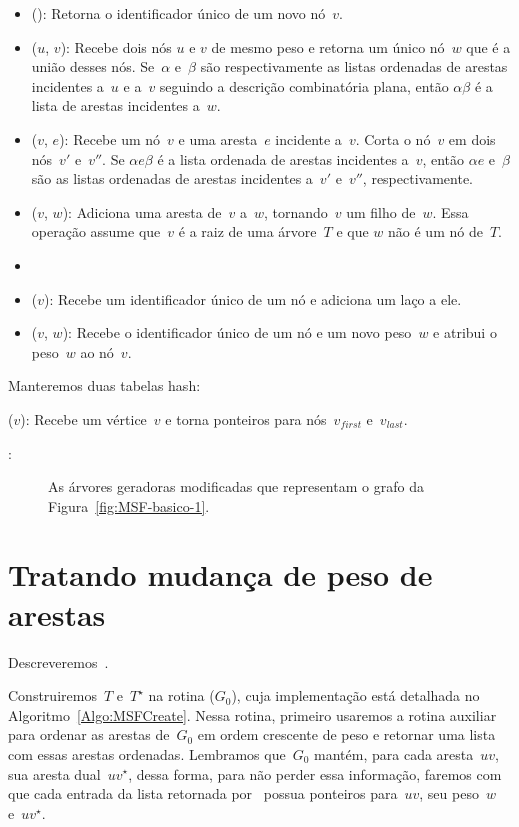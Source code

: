 \begin{itemize}
\item \LCOMakeNode(): Retorna o identificador único de um novo nó~$v$.
\item \LCOMerge($u$, $v$): Recebe dois nós $u$ e $v$ de mesmo peso e retorna um único nó~$w$ que é a união desses nós.
Se~$\alpha$ e~$\beta$ são respectivamente as listas ordenadas de arestas incidentes a~$u$ e a~$v$ seguindo a descrição combinatória plana, então $\alpha\beta$ é a lista de arestas incidentes a~$w$.
\item \LCOSplit($v$, $e$): Recebe um nó~$v$ e uma aresta~$e$ incidente a~$v$.
Corta o nó~$v$ em dois nós~$v'$ e~$v''$. Se $\alpha e\beta$ é a lista ordenada de arestas incidentes a~$v$, então $\alpha e$ e~$\beta$ são as listas ordenadas de arestas incidentes a~$v'$ e~$v''$, respectivamente.
\item \LCOLink($v$, $w$): Adiciona uma aresta de~$v$ a~$w$, tornando~$v$ um filho de~$w$. Essa operação assume que~$v$ é a raiz de uma árvore~$T$ e que $w$ não é um nó de~$T$.
\item \LCOCycle
\item \LCOLoop($v$): Recebe um identificador único de um nó e adiciona um laço a ele.
\item \LCOAddCost($v$, $w$): Recebe o identificador único de um nó e um novo peso~$w$ e atribui o peso~$w$ ao nó~$v$.
\end{itemize}

Manteremos duas tabelas hash:

\hashNP($v$): Recebe um vértice~$v$ e torna ponteiros para nós~$v_{first}$ e~$v_{last}$.

\hashEdges:

\begin{figure}[htb]
\scalebox{1.5}{
\centering

}
\caption{As árvores geradoras modificadas que representam o grafo da Figura~\ref{fig:MSF-basico-1}.}
\label{fig:MSF-figura-4}
\end{figure}


\section{Tratando mudança de peso de arestas}

Descreveremos~\MSFupdate{}.

Construiremos~$T$ e~$T^\star$ na rotina \MSFCreate($G_0$), cuja implementação está detalhada no Algoritmo~\ref{Algo:MSFCreate}.
Nessa rotina, primeiro usaremos a rotina auxiliar~\order{} para ordenar as arestas de~$G_0$ em ordem crescente de peso e retornar uma lista com essas arestas ordenadas.
Lembramos que~$G_0$ mantém, para cada aresta~$uv$, sua aresta dual~$uv^\star$, dessa forma, para não perder essa informação, faremos com que cada entrada da lista retornada por~\order{}
possua ponteiros para~$uv$, seu peso~$w$ e~$uv^\star$.


